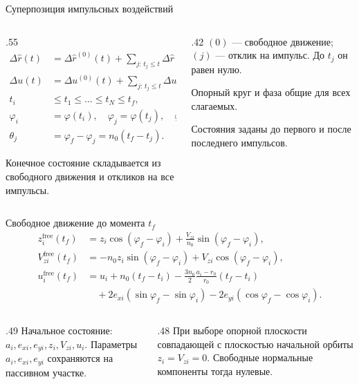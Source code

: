 \documentclass[11pt,aspectratio=169,t]{beamer}
\newcommand{\eqcompact}{\fontsize{10}{12}\selectfont}
\newcommand{\drh}{\Delta\widehat r}
\begin{document}
\begin{frame}{Суперпозиция импульсных воздействий}
\relax
\begin{columns}[T,onlytextwidth]
\begin{column}{.55\textwidth}
{\eqcompact\derivationmathspacing
\[
\begin{aligned}
 \drh(t)&=\drh^{(0)}(t)+\sum_{j:\,t_j\le t}\drh^{(j)}(t),\\[7pt]
 \Delta u(t)&=\Delta u^{(0)}(t)+\sum_{j:\,t_j\le t}\Delta u^{(j)}(t),\\[8pt]
 t_i&\le t_1\le\ldots\le t_N\le t_f,\\[4pt]
 \varphi_i&=\varphi(t_i),\quad\varphi_j=\varphi(t_j),\quad
 \varphi_f=\varphi(t_f),\\[4pt]
 \theta_j&=\varphi_f-\varphi_j=n_0(t_f-t_j).
\end{aligned}
\]
}
\par\medskip\RaggedRight
Конечное состояние складывается из свободного движения и откликов на все импульсы.
\end{column}
\begin{column}{.42\textwidth}
\RaggedRight
$(0)$ — свободное движение; $(j)$ — отклик на импульс. До $t_j$ он равен нулю.\par\medskip
Опорный круг и фаза общие для всех слагаемых.\par\medskip
Состояния заданы до первого и после последнего импульсов.
\end{column}
\end{columns}
\end{frame}

\begin{frame}{Свободное движение до момента $t_f$}
\relax
{\eqcompact\derivationmathspacing
\[
\boxed{\begin{aligned}
 z_i^{\mathrm{free}}(t_f)
 &=z_i\cos(\varphi_f-\varphi_i)
       +\frac{V_{zi}}{n_0}\sin(\varphi_f-\varphi_i),\\[6pt]
 V_{zi}^{\mathrm{free}}(t_f)
 &=-n_0z_i\sin(\varphi_f-\varphi_i)
       +V_{zi}\cos(\varphi_f-\varphi_i),\\[6pt]
 u_i^{\mathrm{free}}(t_f)
 &=u_i+n_0(t_f-t_i)-\frac{3n_0}{2}\frac{a_i-r_0}{r_0}(t_f-t_i)\\[3pt]
 &\quad+2e_{xi}(\sin\varphi_f-\sin\varphi_i)
       -2e_{yi}(\cos\varphi_f-\cos\varphi_i).
\end{aligned}}
\]
}
\begin{columns}[T,onlytextwidth]
\begin{column}{.49\textwidth}
\RaggedRight
Начальное состояние: $a_i,e_{xi},e_{yi},z_i,V_{zi},u_i$. Параметры $a_i,e_{xi},e_{yi}$ сохраняются на пассивном участке.
\end{column}
\begin{column}{.48\textwidth}
\RaggedRight
При выборе опорной плоскости совпадающей с плоскостью начальной орбиты $z_i=V_{zi}=0$. Свободные нормальные компоненты тогда нулевые.
\end{column}
\end{columns}
\end{frame}
\end{document}
